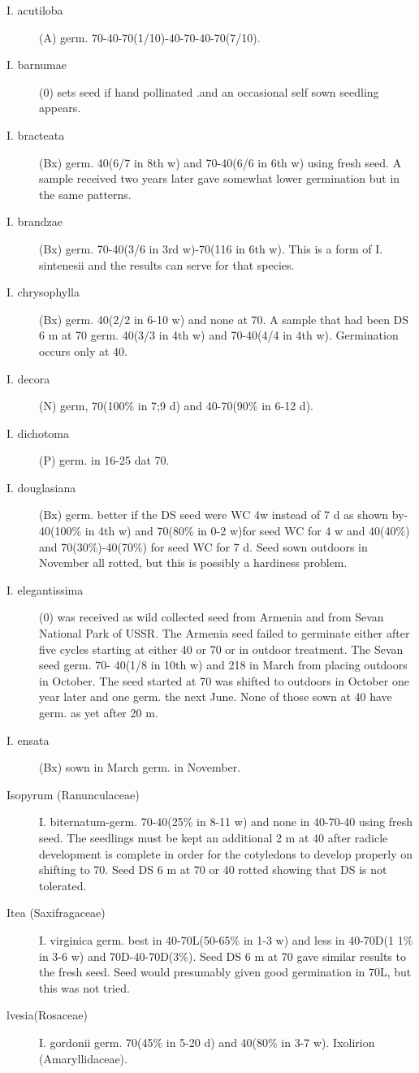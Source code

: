 \begin{description}
\item[I. acutiloba] (A) germ. 70-40-70(1/10)-40-70-40-70(7/10).
\item[I. barnumae] (0) sets seed if hand pollinated .and an occasional self sown
seedling appears.
\item[I. bracteata] (Bx) germ. 40(6/7 in 8th w) and 70-40(6/6 in 6th w) using fresh seed.
A sample received two years later gave somewhat lower germination but in the same
patterns.
\item[I. brandzae] (Bx) germ. 70-40(3/6 in 3rd w)-70(116 in 6th w). This is a form of I.
sintenesii and the results can serve for that species.
\item[I. chrysophylla] (Bx) germ. 40(2/2 in 6-10 w) and none at 70. A sample that had
been DS 6 m at 70 germ. 40(3/3 in 4th w) and 70-40(4/4 in 4th w). Germination occurs
only at 40.
\item[I. decora] (N) germ, 70(100\% in 7;9 d) and 40-70(90\% in 6-12 d).
\item[I. dichotoma] (P) germ. in 16-25 dat 70.
\item[I. douglasiana] (Bx) germ. better if the DS seed were WC 4w instead of 7 d as
shown by-40(100\% in 4th w) and 70(80\% in 0-2 w)for seed WC for 4 w and 40(40\%)
and 70(30\%)-40(70\%) for seed WC for 7 d. Seed sown outdoors in November all
rotted, but this is possibly a hardiness problem.
\item[I. elegantissima] (0) was received as wild collected seed from Armenia and from
Sevan National Park of USSR. The Armenia seed failed to germinate either after five
cycles starting at either 40 or 70 or in outdoor treatment. The Sevan seed germ. 70-
40(1/8 in 10th w) and 218 in March from placing outdoors in October. The seed started
at 70 was shifted to outdoors in October one year later and one germ. the next June.
None of those sown at 40 have germ. as yet after 20 m.
\item[I. ensata] (Bx) sown in March germ. in November.

\item[Isopyrum (Ranunculaceae)] I. biternatum-germ. 70-40(25\% in 8-11 w) and
none in 40-70-40 using fresh seed. The seedlings must be kept an additional 2 m at
40 after radicle development is complete in order for the cotyledons to develop
properly on shifting to 70. Seed DS 6 m at 70 or 40 rotted showing that DS is not
tolerated.

\item[Itea (Saxifragaceae)] I. virginica germ. best in 40-70L(50-65\% in 1-3 w)
and less in 40-70D(1 1\% in 3-6 w) and 70D-40-70D(3\%). Seed DS 6 m at 70 gave
similar results to the fresh seed. Seed would presumably given good germination in
70L, but this was not tried.
\item[lvesia(Rosaceae)] I. gordonii germ. 70(45\% in 5-20 d) and 40(80\% in 3-7 w).
Ixolirion (Amaryllidaceae).


\end{description}

